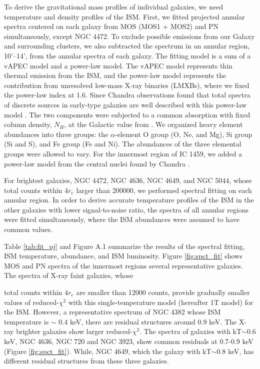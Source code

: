 \documentclass[structabstract]{aa}
\begin{document}
To derive the gravitational mass profiles of individual
galaxies, we need temperature and density profiles of the ISM.
First, we fitted projected annular spectra
 centered on each galaxy from MOS
(MOS1 + MOS2) and PN simultaneously, except NGC 4472. To exclude
possible emissions from our Galaxy and surrounding clusters, we also
subtracted the spectrum in an annular region, 10'--14',
from the annular spectra of
each galaxy. The fitting model is a sum of a
vAPEC model \citep{Smith2001} and a power-law model. The vAPEC
model represents thin thermal emission from the ISM, and the
power-law model represents
the contribution from unresolved low-mass
X-ray binaries (LMXBs),
where we fixed the power-law index at 1.6.
Since Chandra observations found that total spectra of discrete sources
in early-type galaxies are well
described with this power-law model \citep{Blan2001,Rand2004}. The two components were subjected to a
common absorption with fixed column density, $N_H$, at the Galactic value
from \citet{Dick1990}. We organized heavy element abundances
into three groups: the $\alpha$-element O group (O, Ne, and Mg), Si group (Si
and S), and Fe group (Fe and Ni). 
The abundances of the three elemental
groups were allowed to vary. 
For the innermost region  of IC 1459, we added a power-law model 
from the central nuclei  found by Chandra 
 \citep{Fabb2003}.

For brightest galaxies, NGC 4472, NGC 4636, 
NGC 4649, and NGC 5044,  whose
total counts  within 4$r_e$ larger than 200000, we performed spectral
fitting on each annular region. In order to derive accurate
temperature profiles of the ISM in the other galaxies with lower
signal-to-noise ratio, the spectra of all annular regions
were fitted simultaneously, where the ISM abundances 
 were assumed to have common values.

Table \ref{tab:fit_pj} and Figure A.1
summarize the results of the spectral fitting, ISM temperature,
abundance, and ISM luminosity. Figure \ref{fig:spct_fit} shows MOS and PN
spectra of the innermost regions several representative
galaxies. The spectra of
X-ray faint galaxies, whose

total counts within $4r_e$ are smaller than
12000 counts, 
provide gradually smaller values of reduced-$\chi^2$
with this single-temperature model (hereafter
1T model) for the ISM.
However, 
a representative spectrum of NGC 4382 whose ISM temperature is $\sim$
0.4 keV,  there are residual structures around 0.9 keV.
The X-ray brighter galaxies show
larger reduced-$\chi^2$. The spectra of galaxies with
kT$\sim 0.6$ keV,  NGC 4636, NGC 720 and NGC 3923, show common residuals
at 0.7-0.9 keV (Figure \ref{fig:spct_fit}). While, NGC 4649, which the
galaxy with kT$\sim 0.8$ keV, has different residual structures
from these three  galaxies.
\end{document}
